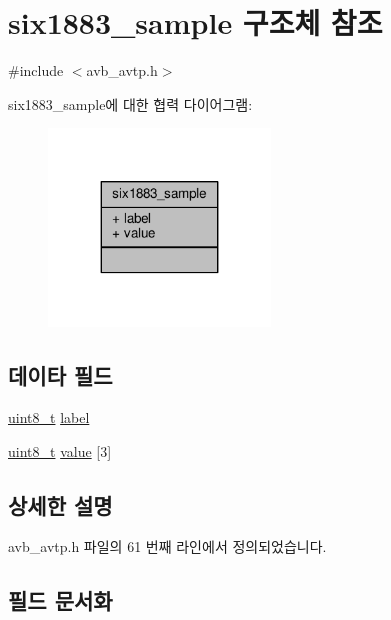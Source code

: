 \hypertarget{structsix1883__sample}{}\section{six1883\+\_\+sample 구조체 참조}
\label{structsix1883__sample}


{\ttfamily \#include $<$avb\+\_\+avtp.\+h$>$}



six1883\+\_\+sample에 대한 협력 다이어그램\+:
\nopagebreak
\begin{figure}[H]
\begin{center}
\leavevmode
\includegraphics[width=167pt]{structsix1883__sample__coll__graph}
\end{center}
\end{figure}
\subsection*{데이타 필드}
\begin{DoxyCompactItemize}
\item 
\hyperlink{stdint_8h_aba7bc1797add20fe3efdf37ced1182c5}{uint8\+\_\+t} \hyperlink{structsix1883__sample_a6abd170e74558ffbdb4fdfb852dbfe0c}{label}
\item 
\hyperlink{stdint_8h_aba7bc1797add20fe3efdf37ced1182c5}{uint8\+\_\+t} \hyperlink{structsix1883__sample_a0fee1dc0f9c734d9591dc4eed119c68a}{value} \mbox{[}3\mbox{]}
\end{DoxyCompactItemize}


\subsection{상세한 설명}


avb\+\_\+avtp.\+h 파일의 61 번째 라인에서 정의되었습니다.



\subsection{필드 문서화}
